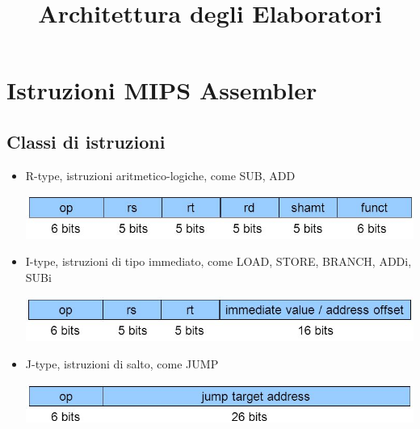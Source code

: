 \documentclass[italian]{article}
\begin{document}
	\title{Architettura degli Elaboratori}
	\maketitle

	\tableofcontents
	\pagebreak
	
	\section{Istruzioni MIPS Assembler}
	
	\subsection{Classi di istruzioni}
	\begin{itemize}[noitemsep]
		\item R-type, istruzioni aritmetico-logiche, come SUB, ADD
		\begin{center}
			\includegraphics[width=0.5\linewidth]{slides/rtype}
		\end{center}
		\item I-type, istruzioni di tipo immediato, come LOAD, STORE, BRANCH, ADDi, SUBi
		\begin{center}
			\includegraphics[width=0.5\linewidth]{slides/itype}
		\end{center}
		\item J-type, istruzioni di salto, come JUMP
		\begin{center}
			\includegraphics[width=0.5\linewidth]{slides/jtype}
		\end{center}
	\end{itemize}
	
\end{document}
